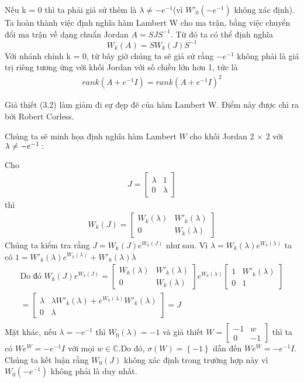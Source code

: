 Nếu k = 0 thì ta phải giả sử thêm là $\lambda \neq -e^{-1}$(vì $W'_{0}(-e^{-1})$ không xác định). \\
Ta hoàn thành việc định nghĩa hàm Lambert W cho ma trận, bằng việc chuyển đổi ma trận về dạng chuẩn Jordan $A = SJS^{-1}$. Từ đó ta có thể định nghĩa
$$ W_k(A) = S W_k(J) S^{-1} $$
Với nhánh chính k = 0, từ bây giờ chúng ta sẽ giả sử rằng $-e^{-1}$ không phải là giá trị riêng tương ứng với khối Jordan với số chiều lớn hơn 1, tức là
\begin{align} rank (A + e^{-1}I) = rank (A + e^{-1}I)^{2} \end{align}

\begin{note} 
Giả thiết (3.2) làm giảm đi sự đẹp đẽ của hàm Lambert W. Điểm này được chỉ ra bởi Robert Corless.
\end{note}

\begin{vd}
Chúng ta sẽ minh họa định nghĩa hàm Lambert $W$ cho khối Jordan 2 $\times$ 2 với $\lambda \neq -e^{-1} : \\ $ 
\end{vd}

Cho
\begin{align*}
 J = \begin{bmatrix} 
\lambda & 1 \\
0 & \lambda
 \end{bmatrix} 
\end{align*}
thì 
\begin{align*}
 W_k(J) = \begin{bmatrix} 
W_k(\lambda) & W'_k(\lambda) \\
0 & W_k(\lambda) \end{bmatrix} 
\end{align*}
Chúng ta kiểm tra rằng $J = W_k(J)e^{W_k(J)}$ như sau. Vì $\lambda = W_k(\lambda)e^{W_k(\lambda)}$ ta có $1 = W'_k(\lambda)e^{W_k(\lambda )} + W'_k(\lambda)\lambda$
\begin{align*}
\mbox{Do đó } W_k(J)e^{W_k(J)} = \begin{bmatrix} 
W_k(\lambda) & W'_k(\lambda) \\
0 & W_k(\lambda) 
\end{bmatrix}
e^{W_k(\lambda)} \begin{bmatrix} 
1 & W'_k(\lambda) \\
0 & 1 
\end{bmatrix} \\
= \begin{bmatrix} 
\lambda & \lambda W'_k(\lambda) + e^{W_k(\lambda)} W'_k(\lambda)\\
0 & \lambda 
\end{bmatrix} 
 = J \\
\end{align*}
Mặt khác, nếu $\lambda = -e^{-1}$ thì $W_0(\lambda) = -1$ và giả thiết $W = \begin{bmatrix} 
-1 & w \\
0 & -1
\end{bmatrix}$ thì ta có $We^{W} = -e^{-1}I \mbox{ với mọi }  w \in \mathbb{C}$.Do đó, $\sigma(W) =  \left\{-1\right\}$ dẫn đến $We^{W} = -e^{-1}I$. Chúng ta kết luận rằng $W_0(J)$ không xác định trong trường hợp này vì $W_0(-e^{-1})$ không phải là duy nhất.

